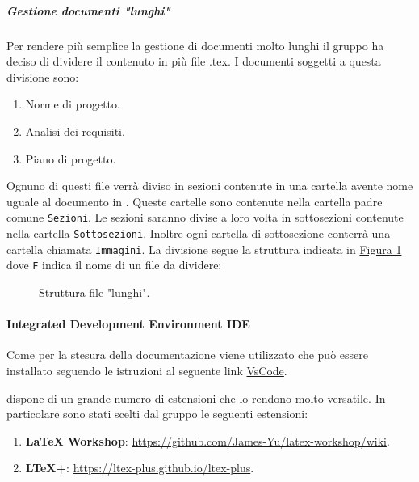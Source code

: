 \subparagraph{Gestione documenti "lunghi"}
Per rendere più semplice la gestione di documenti molto lunghi il gruppo ha deciso di dividere il contenuto in più file .tex.
I documenti soggetti a questa divisione sono:
\begin{enumerate}
    \item Norme di progetto.
    \item Analisi dei requisiti.
    \item Piano di progetto.
\end{enumerate}
Ognuno di questi file verrà diviso in sezioni contenute in una cartella avente nome uguale al documento in .
Queste cartelle sono contenute nella cartella padre comune \texttt{Sezioni}.
Le sezioni saranno divise a loro volta in sottosezioni contenute nella cartella \texttt{Sottosezioni}.
Inoltre ogni cartella di sottosezione conterrà una cartella chiamata \texttt{Immagini}.
La divisione segue la struttura indicata in \hyperref[fig:struttura_file_lungi]{Figura \ref{fig:struttura_file_lungi}} dove \texttt{F} indica il nome di un file da dividere:

\begin{figure}[H]
    \caption{Struttura file "lunghi".}
    \label{fig:struttura_file_lungi}
\end{figure}


\paragraph{Integrated Development Environment IDE}
\label{par:IDE}
Come  per la stesura della documentazione viene utilizzato  che può essere installato seguendo le istruzioni al seguente link \href{https://code.visualstudio.com/docs/setup/windows}{VsCode}.

 dispone di un grande numero di estensioni che lo rendono molto versatile.
In particolare sono stati scelti dal gruppo le seguenti estensioni:
\begin{enumerate}
    \item \textbf{LaTeX Workshop}: \href{https://github.com/James-Yu/latex-workshop/wiki}{https://github.com/James-Yu/latex-workshop/wiki}.
    \item \textbf{LTeX+}: \href{ https://ltex-plus.github.io/ltex-plus}{ https://ltex-plus.github.io/ltex-plus}.
\end{enumerate}

